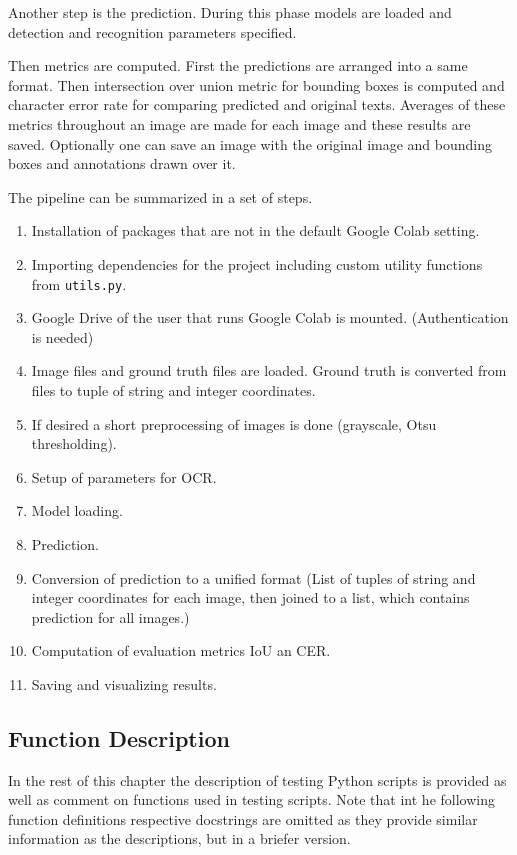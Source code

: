 Another step is the prediction. During this phase models are loaded and detection and recognition parameters specified. 

Then metrics are computed. First the predictions are arranged into a same format. Then intersection over union metric for bounding boxes is computed and character error rate for comparing predicted and original texts. Averages of these metrics throughout an image are made for each image and these results are saved. Optionally one can save an image with the original image and bounding boxes and annotations drawn over it.

The pipeline can be summarized in a set of steps.
\begin{enumerate}
    \item Installation of packages that are not in the default Google Colab setting.
    \item Importing dependencies for the project including custom utility functions from \texttt{utils.py}.
    \item Google Drive of the user that runs Google Colab is mounted. (Authentication is needed)
    \item Image files and ground truth files are loaded. Ground truth is converted from files to tuple of string and integer coordinates.
    \item If desired a short preprocessing of images is done (grayscale, Otsu thresholding).
    \item Setup of parameters for OCR.
    \item Model loading.
    \item Prediction.
    \item Conversion of prediction to a unified format (List of tuples of string and integer coordinates for each image, then joined to a list, which contains prediction for all images.)
    \item Computation of evaluation metrics IoU an CER.
    \item Saving and visualizing results.
\end{enumerate}


\subsection{Function Description}
In the rest of this chapter the description of testing Python scripts is provided as well as comment on functions used in testing scripts. Note that int he following function definitions respective docstrings are omitted as they provide similar information as the descriptions, but in a 	briefer version.    

